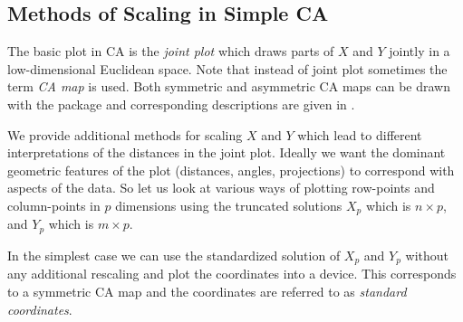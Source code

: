 \documentclass[article]{Z}
\begin{document}
\subsection{Methods of Scaling in Simple CA}
\label{sec:scaling}
The basic plot in CA is the \emph{joint plot} which draws parts of $X$ and $Y$ jointly in a low-dimensional Euclidean space. Note that instead of joint plot sometimes the term \emph{CA map} is used. Both symmetric and asymmetric CA maps can be drawn with the  package and corresponding descriptions are given in \citet{Nenadic+Greenacre:06}.

We provide additional methods for scaling $X$ and $Y$ which lead to different interpretations of the distances in the joint plot. Ideally we want the dominant geometric features of the plot (distances, angles, projections) to correspond with aspects of the data. So let us look at various ways of plotting row-points and column-points in $p$ dimensions using the truncated solutions  $X_p$ which is $n \times p$, and $Y_p$ which is $m \times p$. 

In the simplest case we can use the standardized solution of $X_p$ and $Y_p$ without any additional rescaling and plot the coordinates into a device. This corresponds to a symmetric CA map and the coordinates are referred to as \emph{standard coordinates}. 
\end{document}
